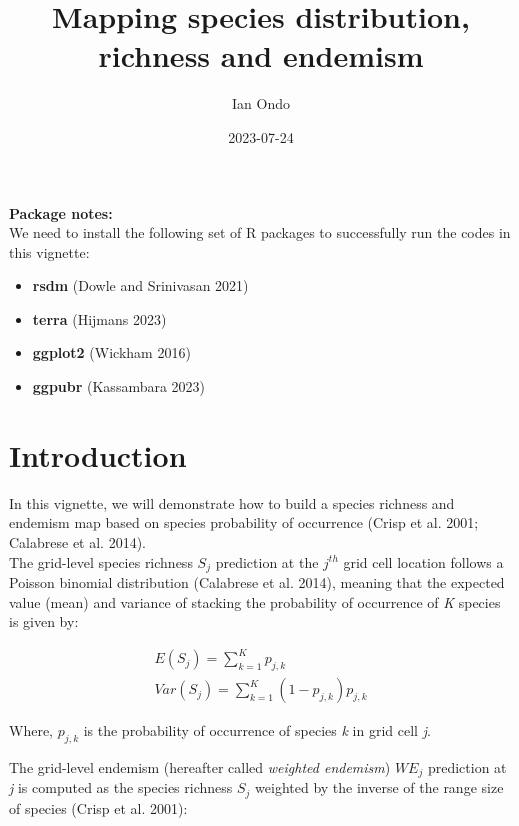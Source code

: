 \documentclass[
]{article}
\title{Mapping species distribution, richness and endemism}
\author{Ian Ondo}
\date{2023-07-24}
\providecommand{\tightlist}{%
  \setlength{\itemsep}{0pt}\setlength{\parskip}{0pt}}
\begin{document}
\maketitle

{
\setcounter{tocdepth}{2}
\tableofcontents
}
\begin{warningbox}

\textbf{Package notes:}\\
We need to install the following set of R packages to successfully run
the codes in this vignette:

\begin{itemize}
\tightlist
\item
  \textbf{rsdm} (Dowle and Srinivasan 2021)
\item
  \textbf{terra} (Hijmans 2023)
\item
  \textbf{ggplot2} (Wickham 2016)
\item
  \textbf{ggpubr} (Kassambara 2023)
\end{itemize}

\end{warningbox}

\hypertarget{introduction}{%
\section{Introduction}\label{introduction}}

In this vignette, we will demonstrate how to build a species richness
and endemism map based on species probability of occurrence (Crisp et
al. 2001; Calabrese et al. 2014).\\
The grid-level species richness \(S_j\) prediction at the \(j^{th}\)
grid cell location follows a Poisson binomial distribution (Calabrese et
al. 2014), meaning that the expected value (mean) and variance of
stacking the probability of occurrence of \emph{K} species is given by:

\begin{gather}
\tag{1}
E(S_j) = \sum_{k=1}^Kp_{j,k}
\\
\tag{2}
Var(S_j) = \sum_{k=1}^K(1-p_{j,k})p_{j,k}
\end{gather}

Where, \(p_{j,k}\) is the probability of occurrence of species \emph{k}
in grid cell \emph{j}.

The grid-level endemism (hereafter called \emph{weighted endemism})
\(WE_j\) prediction at \emph{j} is computed as the species richness
\(S_j\) weighted by the inverse of the range size of species (Crisp et
al. 2001):
\end{document}

